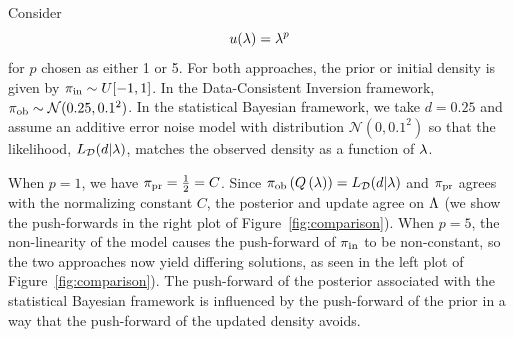 \begin{ex}
Consider
\begin{equation}
u(\lambda) = \lambda^p
\end{equation}
for $p$ chosen as either 1 or 5.
For both approaches, the prior or initial density is given by $\operatorname*{\pi_{in}} \sim U[-1,1]$.
In the Data-Consistent Inversion framework, $\operatorname*{\pi_{ob}} \sim \mathcal{N}(0.25,0.1^2)$.
In the statistical Bayesian framework, we take $d=0.25$ and assume an additive error noise model with distribution $\mathcal{N}(0,0.1^2)$ so that the likelihood, $L_{\mathcal{D}}(d | \lambda)$, matches the observed density as a function of $\lambda$.

When $p=1$, we have $\operatorname*{\pi_{pr}} = \frac{1}{2} = C$.
Since $\operatorname*{\pi_{ob}}\left ( Q\left ( \lambda \right ) \right ) = L_{\mathcal{D}}(d|\lambda)$ and $\operatorname*{\pi_{pr}}$ agrees with the normalizing constant $C$, the posterior and update agree on ${\Lambda}$ (we show the push-forwards in the right plot of Figure~\ref{fig:comparison}).
When $p=5$, the non-linearity of the model causes the push-forward of $\operatorname*{\pi_{in}}$ to be non-constant, so the two approaches now yield differing solutions, as seen in the left plot of Figure~\ref{fig:comparison}).
The push-forward of the posterior associated with the statistical Bayesian framework is influenced by the push-forward of the prior in a way that the push-forward of the updated density avoids.


\end{ex}
